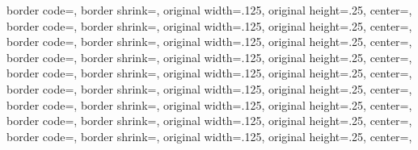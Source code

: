{{	border code=\pgfsetlinewidth{.5pt}\pgfstroke,%
  }%
  {%
	border shrink=\pgfpageoptionborder,%
	original width=.125\pgfpageoptionheight,%
	original height=.25\pgfpageoptionwidth,%
	center=\pgfpoint{0pt}{.875\pgfphysicalheight},%
	border code=\pgfsetlinewidth{.5pt}\pgfstroke,%
  }%
  {%
	border shrink=\pgfpageoptionborder,%
	original width=.125\pgfpageoptionheight,%
	original height=.25\pgfpageoptionwidth,%
	center=\pgfpoint{.75\pgfphysicalwidth}{.75\pgfphysicalheight},%
	border code=\pgfsetlinewidth{.5pt}\pgfstroke,%
  }%
  {%
	border shrink=\pgfpageoptionborder,%
	original width=.125\pgfpageoptionheight,%
	original height=.25\pgfpageoptionwidth,%
	center=\pgfpoint{.5\pgfphysicalwidth}{.75\pgfphysicalheight},%
	border code=\pgfsetlinewidth{.5pt}\pgfstroke,%
	}%
  {%
	border shrink=\pgfpageoptionborder,%
	original width=.125\pgfpageoptionheight,%
	original height=.25\pgfpageoptionwidth,%
	center=\pgfpoint{.25\pgfphysicalwidth}{.75\pgfphysicalheight},%
	border code=\pgfsetlinewidth{.5pt}\pgfstroke,%
  }%
  {%
	border shrink=\pgfpageoptionborder,%
	original width=.125\pgfpageoptionheight,%
	original height=.25\pgfpageoptionwidth,%
	center=\pgfpoint{0pt}{.75\pgfphysicalheight},%
	border code=\pgfsetlinewidth{.5pt}\pgfstroke,%
  }%
  {%
	border shrink=\pgfpageoptionborder,%
	original width=.125\pgfpageoptionheight,%
	original height=.25\pgfpageoptionwidth,%
	center=\pgfpoint{.75\pgfphysicalwidth}{.625\pgfphysicalheight},%
	border code=\pgfsetlinewidth{.5pt}\pgfstroke,%
  }%
  {%
	border shrink=\pgfpageoptionborder,%
	original width=.125\pgfpageoptionheight,%
	original height=.25\pgfpageoptionwidth,%
	center=\pgfpoint{.5\pgfphysicalwidth}{.625\pgfphysicalheight},%
	border code=\pgfsetlinewidth{.5pt}\pgfstroke,%
	}%
  {%
	border shrink=\pgfpageoptionborder,%
	original width=.125\pgfpageoptionheight,%
	original height=.25\pgfpageoptionwidth,%
	center=\pgfpoint{.25\pgfphysicalwidth}{.625\pgfphysicalheight},%
	border code=\pgfsetlinewidth{.5pt}\pgfstroke,%
  }%
  {%
	border shrink=\pgfpageoptionborder,%
	original width=.125\pgfpageoptionheight,%
	original height=.25\pgfpageoptionwidth,%
	center=\pgfpoint{0pt}{.625\pgfphysicalheight},%
}}
